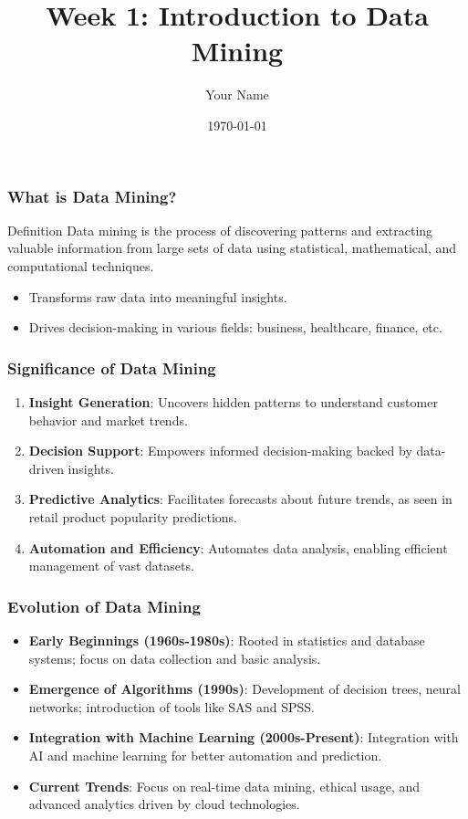\documentclass{beamer}
\title{Week 1: Introduction to Data Mining}
\author{Your Name}
\institute{Your Institution}
\date{\today}
\begin{document}
\frame{\titlepage}

\begin{frame}[fragile]
    \titlepage
\end{frame}

\begin{frame}[fragile]
    \frametitle{What is Data Mining?}
    \begin{block}{Definition}
        Data mining is the process of discovering patterns and extracting valuable information from large sets of data using statistical, mathematical, and computational techniques.
    \end{block}
    \begin{itemize}
        \item Transforms raw data into meaningful insights.
        \item Drives decision-making in various fields: business, healthcare, finance, etc.
    \end{itemize}
\end{frame}

\begin{frame}[fragile]
    \frametitle{Significance of Data Mining}
    \begin{enumerate}
        \item \textbf{Insight Generation}: Uncovers hidden patterns to understand customer behavior and market trends.
        \item \textbf{Decision Support}: Empowers informed decision-making backed by data-driven insights.
        \item \textbf{Predictive Analytics}: Facilitates forecasts about future trends, as seen in retail product popularity predictions.
        \item \textbf{Automation and Efficiency}: Automates data analysis, enabling efficient management of vast datasets.
    \end{enumerate}
\end{frame}

\begin{frame}[fragile]
    \frametitle{Evolution of Data Mining}
    \begin{itemize}
        \item \textbf{Early Beginnings (1960s-1980s)}: Rooted in statistics and database systems; focus on data collection and basic analysis.
        \item \textbf{Emergence of Algorithms (1990s)}: Development of decision trees, neural networks; introduction of tools like SAS and SPSS.
        \item \textbf{Integration with Machine Learning (2000s-Present)}: Integration with AI and machine learning for better automation and prediction.
        \item \textbf{Current Trends}: Focus on real-time data mining, ethical usage, and advanced analytics driven by cloud technologies.
    \end{itemize}
\end{frame}
\end{document}
